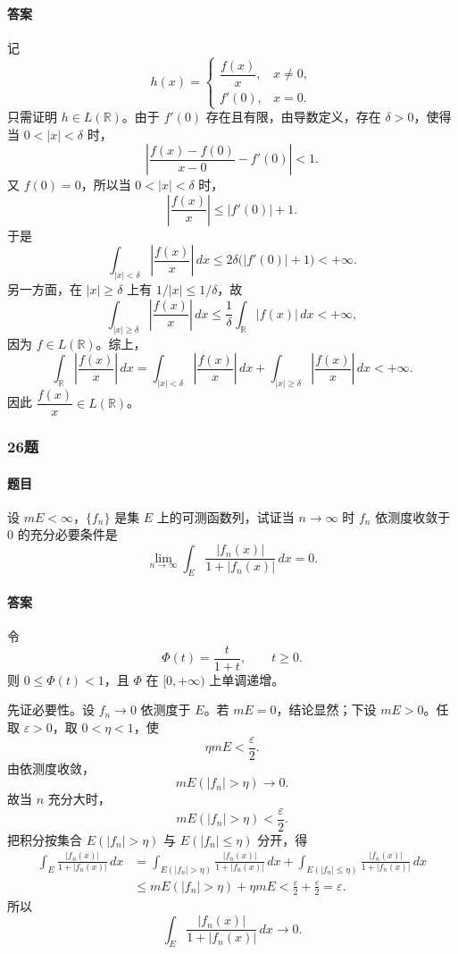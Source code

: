\documentclass{article}
\begin{document}
\paragraph{答案} 记
\[
 h(x)=\begin{cases}
 \dfrac{f(x)}{x},&x\ne0,\\[4pt]
 f'(0),&x=0.
 \end{cases}
\]
只需证明 $h\in L(\mathbb{R})$。由于 $f'(0)$ 存在且有限，由导数定义，存在 $\delta>0$，使得当 $0<|x|<\delta$ 时，
\[
 \left|\frac{f(x)-f(0)}{x-0}-f'(0)\right|<1.
\]
又 $f(0)=0$，所以当 $0<|x|<\delta$ 时，
\[
 \left|\frac{f(x)}{x}\right|\le |f'(0)|+1.
\]
于是
\[
 \int_{|x|<\delta}\left|\frac{f(x)}{x}\right|\,dx
 \le 2\delta\bigl(|f'(0)|+1\bigr)<+\infty.
\]
另一方面，在 $|x|\ge\delta$ 上有 $1/|x|\le1/\delta$，故
\[
 \int_{|x|\ge\delta}\left|\frac{f(x)}{x}\right|\,dx
 \le \frac1\delta\int_{\mathbb{R}}|f(x)|\,dx<+\infty,
\]
因为 $f\in L(\mathbb{R})$。综上，
\[
 \int_{\mathbb{R}}\left|\frac{f(x)}{x}\right|\,dx
 =\int_{|x|<\delta}\left|\frac{f(x)}{x}\right|\,dx
 +\int_{|x|\ge\delta}\left|\frac{f(x)}{x}\right|\,dx<+\infty.
\]
因此 $\dfrac{f(x)}{x}\in L(\mathbb{R})$。


\subsubsection*{26题}
\paragraph{题目} 设 $mE<\infty$，$\{f_n\}$ 是集 $E$ 上的可测函数列，试证当 $n\to\infty$ 时 $f_n$ 依测度收敛于 $0$ 的充分必要条件是
\[
 \lim_{n\to\infty}\int_E\frac{|f_n(x)|}{1+|f_n(x)|}\,dx=0.
\]

\paragraph{答案} 令
\[
 \Phi(t)=\frac{t}{1+t},\qquad t\ge0.
\]
则 $0\le\Phi(t)<1$，且 $\Phi$ 在 $[0,+\infty)$ 上单调递增。

先证必要性。设 $f_n\to0$ 依测度于 $E$。若 $mE=0$，结论显然；下设 $mE>0$。任取 $\varepsilon>0$，取 $0<\eta<1$，使
\[
 \eta mE<\frac{\varepsilon}{2}.
\]
由依测度收敛，
\[
 mE(|f_n|>\eta)\to0.
\]
故当 $n$ 充分大时，
\[
 mE(|f_n|>\eta)<\frac{\varepsilon}{2}.
\]
把积分按集合 $E(|f_n|>\eta)$ 与 $E(|f_n|\le\eta)$ 分开，得
\[
\begin{aligned}
 \int_E\frac{|f_n(x)|}{1+|f_n(x)|}\,dx
 &=\int_{E(|f_n|>\eta)}\frac{|f_n(x)|}{1+|f_n(x)|}\,dx
   +\int_{E(|f_n|\le\eta)}\frac{|f_n(x)|}{1+|f_n(x)|}\,dx \\
 &\le mE(|f_n|>\eta)+\eta mE
 <\frac{\varepsilon}{2}+\frac{\varepsilon}{2}=\varepsilon.
\end{aligned}
\]
所以
\[
 \int_E\frac{|f_n(x)|}{1+|f_n(x)|}\,dx\to0.
\]
\end{document}
